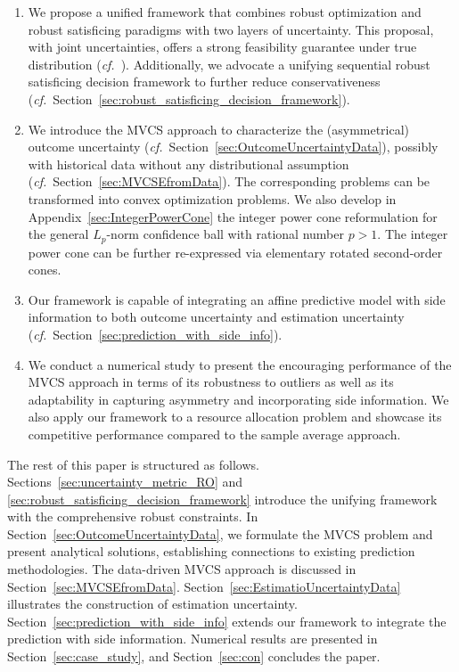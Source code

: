 \documentclass[opre, blindrev]{informs4}
\newcommand{\1}[1]{\mathds{1}{\left(#1\right)}}
\begin{document}
\begin{enumerate}
\item We propose a unified framework that combines robust optimization and robust satisficing paradigms with two layers of uncertainty. This proposal, with joint uncertainties, offers a strong feasibility guarantee under true distribution (\textit{cf.}~). Additionally, we advocate a unifying sequential robust satisficing decision framework to further reduce conservativeness (\textit{cf.}~Section~\ref{sec:robust_satisficing_decision_framework}).
\item We introduce the MVCS approach to characterize the (asymmetrical) outcome uncertainty (\textit{cf.}~Section~\ref{sec:OutcomeUncertaintyData}),  possibly with historical data without any distributional assumption (\textit{cf.}~Section~\ref{sec:MVCSEfromData}). The corresponding problems can be transformed into convex optimization problems. We also develop in Appendix~\ref{sec:IntegerPowerCone} the integer power cone reformulation for the general $L_p$-norm confidence ball with rational number $p>1$. The integer power cone can be further re-expressed via elementary rotated second-order cones.
\item Our framework is capable of integrating an affine predictive model with side information to both outcome uncertainty and estimation uncertainty (\textit{cf.}~Section~\ref{sec:prediction_with_side_info}).
\item We conduct a numerical study to present the encouraging performance of the MVCS approach in terms of its robustness to outliers as well as its adaptability in capturing asymmetry and incorporating side information. We also apply our framework to a resource allocation problem and showcase its competitive performance compared to the sample average approach.
\end{enumerate}

The rest of this paper is structured as follows. Sections~\ref{sec:uncertainty_metric_RO} and \ref{sec:robust_satisficing_decision_framework} introduce the unifying framework with the comprehensive robust constraints. In Section~\ref{sec:OutcomeUncertaintyData}, we formulate the MVCS problem and present analytical solutions, establishing connections to existing prediction methodologies. The data-driven MVCS approach is discussed in Section~\ref{sec:MVCSEfromData}. Section~\ref{sec:EstimatioUncertaintyData} illustrates the construction of estimation uncertainty. Section~\ref{sec:prediction_with_side_info} extends our framework to integrate the prediction with side information. Numerical results are presented in Section~\ref{sec:case_study}, and Section~\ref{sec:con} concludes the paper.
\end{document}
